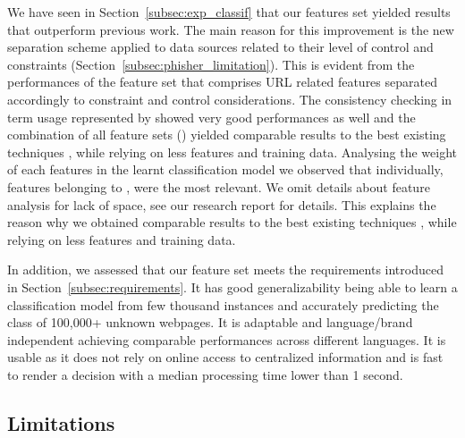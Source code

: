 \documentclass[10pt,conference,compsocconf,letterpaper]{IEEEtran}
\begin{document}
We have seen in Section~\ref{subsec:exp_classif} that our features set yielded results that outperform previous work. The main reason for this improvement is the new separation scheme applied to data sources related to their level of control and constraints (Section~\ref{subsec:phisher_limitation}). 
\iffeateval
This is evident from the performances of the feature set  that comprises URL related features separated accordingly to constraint and control considerations.
The consistency checking in term usage represented by  showed very good performances as well and the combination of all feature sets () yielded comparable results to the best existing techniques \cite{whittaker:2010:large}, while relying on less features and training data.
\else
Analysing the weight of each features in the learnt classification model we observed that individually, features belonging to , were the most relevant. We omit details about feature analysis for lack of space, see our research report \cite{arXiv} for details. This explains the reason why we obtained comparable results to the best existing techniques \cite{whittaker:2010:large}, while relying on less features and training data.
\fi

In addition, we assessed that our feature set meets the requirements introduced in Section~\ref{subsec:requirements}. It has good generalizability being able to learn a classification model from few thousand instances and accurately predicting the class of 100,000+ unknown webpages. It is adaptable and language/brand independent achieving comparable performances across different languages. It is usable as it does not rely on online access to centralized information and is fast to render a decision with a median processing time lower than 1 second.
 
\subsection{Limitations}
\end{document}
